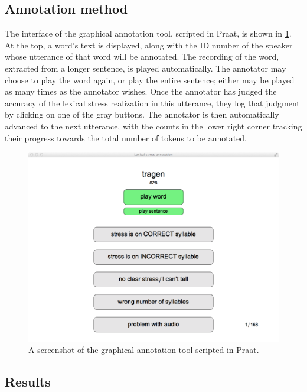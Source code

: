 	\subsection{Annotation method}

	

	
	The interface of the graphical annotation tool, scripted in Praat, is shown in \cref{fig:annotationtool}. At the top, a word's text is displayed, along with the ID number of the speaker whose utterance of that word will be annotated. The recording of the word, extracted from a longer sentence, is played automatically. The annotator may choose to play the word again, or play the entire sentence; either may be played as many times as the annotator wishes. Once the annotator has judged the accuracy of the lexical stress realization in this utterance, they log that judgment by clicking on one of the gray buttons. The annotator is then automatically advanced to the next utterance, with the counts in the lower right corner tracking their progress towards the total number of tokens to be annotated. 
	
		\begin{figure}[bht]
			\centering
			\includegraphics[width=\textwidth]{../img/screenshots/AnnotationTool}
			\caption{A screenshot of the graphical annotation tool scripted in Praat.  }
			\label{fig:annotationtool}
		\end{figure}
	
	\subsection{Results}
	
